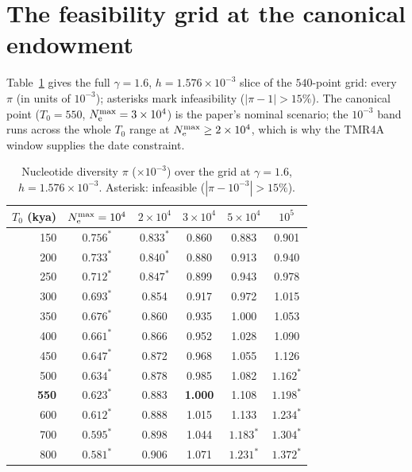 \section{The feasibility grid at the canonical endowment}\label{app:grid}
Table~\ref{tab:gridfull} gives the full $\gamma = 1.6$,
$h = 1.576\times10^{-3}$ slice of the $540$-point grid: every $\pi$
(in units of $10^{-3}$); asterisks mark infeasibility
($|\pi - 1| > 15\%$). The canonical point
($T_0 = 550$, $N_{\mathrm{e}}^{\max} = 3\times10^{4}$) is the paper's nominal
scenario; the $10^{-3}$ band runs across the whole $T_0$ range at
$N_{\mathrm{e}}^{\max} \ge 2\times10^{4}$, which is why the TMR4A window supplies
the date constraint.

\begin{table}[h]
\centering\small
\caption{Nucleotide diversity $\pi$ ($\times10^{-3}$) over the grid at
$\gamma = 1.6$, $h = 1.576\times10^{-3}$. Asterisk: infeasible
($|\pi - 10^{-3}| > 15\%$).}
\label{tab:gridfull}
\begin{tabular}{rccccc}
\toprule
$T_0$ (kya) & $N_{\mathrm{e}}^{\max}=10^4$ & $2\times10^4$ & $3\times10^4$ & $5\times10^4$ & $10^5$ \\
\midrule
150 & $0.756^{*}$ & $0.833^{*}$ & 0.860 & 0.883 & 0.901 \\
200 & $0.733^{*}$ & $0.840^{*}$ & 0.880 & 0.913 & 0.940 \\
250 & $0.712^{*}$ & $0.847^{*}$ & 0.899 & 0.943 & 0.978 \\
300 & $0.693^{*}$ & 0.854 & 0.917 & 0.972 & 1.015 \\
350 & $0.676^{*}$ & 0.860 & 0.935 & 1.000 & 1.053 \\
400 & $0.661^{*}$ & 0.866 & 0.952 & 1.028 & 1.090 \\
450 & $0.647^{*}$ & 0.872 & 0.968 & 1.055 & 1.126 \\
500 & $0.634^{*}$ & 0.878 & 0.985 & 1.082 & $1.162^{*}$ \\
\textbf{550} & $0.623^{*}$ & 0.883 & \textbf{1.000} & 1.108 & $1.198^{*}$ \\
600 & $0.612^{*}$ & 0.888 & 1.015 & 1.133 & $1.234^{*}$ \\
700 & $0.595^{*}$ & 0.898 & 1.044 & $1.183^{*}$ & $1.304^{*}$ \\
800 & $0.581^{*}$ & 0.906 & 1.071 & $1.231^{*}$ & $1.372^{*}$ \\
\bottomrule
\end{tabular}
\end{table}

